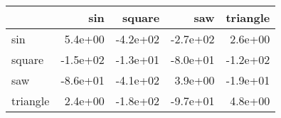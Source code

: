 \begin{tabular}{lrrrr}
\toprule
{} &      sin &   square &      saw &  triangle \\
\midrule
sin      &  5.4e+00 & -4.2e+02 & -2.7e+02 &   2.6e+00 \\
square   & -1.5e+02 & -1.3e+01 & -8.0e+01 &  -1.2e+02 \\
saw      & -8.6e+01 & -4.1e+02 &  3.9e+00 &  -1.9e+01 \\
triangle &  2.4e+00 & -1.8e+02 & -9.7e+01 &   4.8e+00 \\
\bottomrule
\end{tabular}
